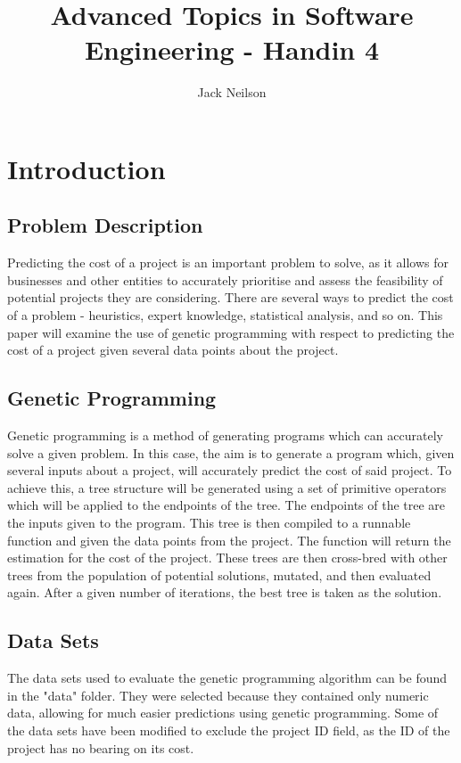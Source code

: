 \documentclass[12pt]{article}
\begin{document}
\title{Advanced Topics in Software Engineering - Handin 4}
\author{Jack Neilson}
\maketitle
\newpage
\tableofcontents
\newpage

\section{Introduction}
\subsection{Problem Description}
Predicting the cost of a project is an important problem to solve, as it allows for businesses and other entities to accurately prioritise and assess the feasibility of potential projects they are considering. There are several ways to predict the cost of a problem - heuristics, expert knowledge, statistical analysis, and so on. This paper will examine the use of genetic programming with respect to predicting the cost of a project given several data points about the project. 
\subsection{Genetic Programming}
Genetic programming is a method of generating programs which can accurately solve a given problem. In this case, the aim is to generate a program which, given several inputs about a project, will accurately predict the cost of said project. To achieve this, a tree structure will be generated using a set of primitive operators which will be applied to the endpoints of the tree. The endpoints of the tree are the inputs given to the program. This tree is then compiled to a runnable function and given the data points from the project. The function will return the estimation for the cost of the project. These trees are then cross-bred with other trees from the population of potential solutions, mutated, and then evaluated again. After a given number of iterations, the best tree is taken as the solution.
\subsection{Data Sets}
The data sets used to evaluate the genetic programming algorithm can be found in the "data" folder. They were selected because they contained only numeric data, allowing for much easier predictions using genetic programming. Some of the data sets have been modified to exclude the project ID field, as the ID of the project has no bearing on its cost.
\end{document}
